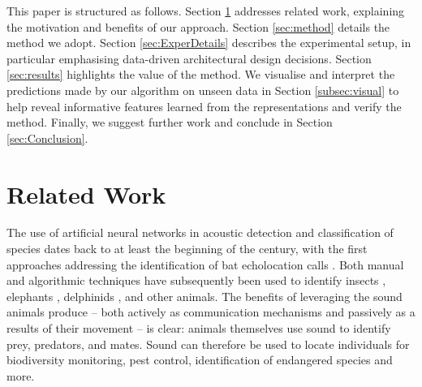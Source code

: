 \documentclass[10pt, twocolumn]{llncs}
\newcommand{\dzN}[1]{\todo[inline, size=\small, color=yellow!30]{[dz] #1}}
\newcommand{\ikN}[1]{\todo[inline, size=\small, color=orange!30]{[ik] #1}}
\begin{document}
This paper is structured as follows. Section \ref{sec:Context} addresses related work, explaining the motivation and benefits of our approach. Section \ref{sec:method} details the method we adopt. Section \ref{sec:ExperDetails} describes the experimental setup, in particular emphasising data-driven architectural design decisions. Section \ref{sec:results} highlights the value of the method. We visualise and interpret the predictions made by our algorithm on unseen data in Section \ref{subsec:visual} to help reveal informative features learned from the representations and verify the method.  Finally, we suggest further work and conclude in Section \ref{sec:Conclusion}.

\section{Related Work}
\label{sec:Context}
%
The use of artificial neural networks in acoustic detection and classification of species dates back to at least the beginning of the century, with the first approaches addressing the identification of bat echolocation calls \cite{parsons2000}. Both manual and algorithmic techniques have subsequently been used to identify insects \cite{chesmore2004automated,zilli2014hidden}, elephants \cite{clemins2002automatic}, delphinids \cite{oswald2003}, and other animals. The benefits of leveraging the sound animals produce -- both actively as communication mechanisms and passively as a results of their movement -- is clear: animals themselves use sound to identify prey, predators, and mates. Sound can therefore be used to locate individuals for biodiversity monitoring, pest control, identification of endangered species and more.
\end{document}
